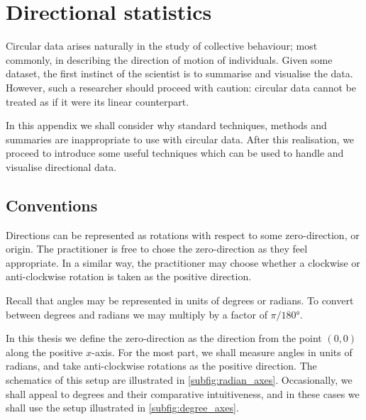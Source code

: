 \graphicspath{{fig/circ_stats_intro/}}

\chapter{Directional statistics}	
\label{cha:direct_stats}

Circular data arises naturally in the study of collective behaviour; most
commonly, in describing the direction of motion of individuals. Given some
dataset, the first instinct of the scientist is to summarise and visualise the
data. However, such a researcher should proceed with caution: circular data
cannot be treated as if it were its linear counterpart.

In this appendix we shall consider why standard techniques, methods and
summaries are inappropriate to use with circular data. After this realisation,
we proceed to introduce some useful techniques which can be used to handle and
visualise directional data.

\section{Conventions}
\label{sec:conventions}

Directions can be represented as rotations with respect to some zero-direction,
or origin. The practitioner is free to chose the zero-direction as they feel
appropriate. In a similar way, the practitioner may choose whether a clockwise
or anti-clockwise rotation is taken as the positive direction.

Recall that angles may be represented in units of degrees or radians. To
convert between degrees and radians we may multiply by a factor of
$\pi/\ang{180}$.

In this thesis we define the zero-direction as the direction from the point
$(0, 0)$ along the positive $x$-axis. For the most part, we shall measure
angles in units of radians, and take anti-clockwise rotations as the positive
direction. The schematics of this setup are illustrated in
\cref{subfig:radian_axes}. Occasionally, we shall appeal to degrees and their
comparative intuitiveness, and in these cases we shall use the setup
illustrated in
\cref{subfig:degree_axes}.

